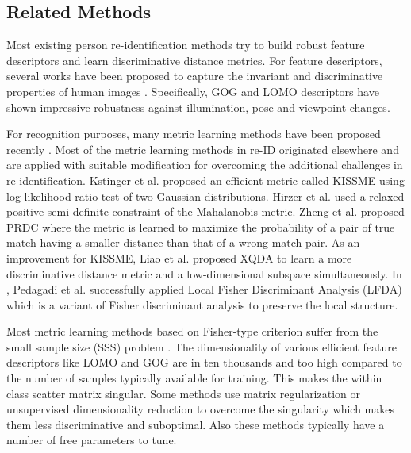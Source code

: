 \documentclass[runningheads]{llncs}
\begin{document}
\subsection{Related Methods}
Most existing person re-identification methods try to build robust feature descriptors and learn discriminative distance metrics. For feature descriptors, several works have been proposed to capture the invariant and discriminative properties of human images \cite{SDALF,LOMO,GOG,ELF,ColorInvariants,midlevel,colornames,LisantiPAMI14}. Specifically, GOG\cite{GOG} and LOMO\cite{LOMO} descriptors have shown impressive robustness against illumination, pose and viewpoint changes.


For recognition purposes, many metric learning methods have been proposed recently \cite{PRDC,RPLM,LFDA:CVPR,rPcca,KISSME,LOMO,ExPolyFeatMap,Zheng:nfst,SSSVM}. Most of the metric learning methods in re-ID originated elsewhere and are applied with suitable modification for overcoming the additional challenges in re-identification. Kstinger et al. proposed an efficient metric called KISSME \cite{KISSME} using log likelihood ratio test of two Gaussian distributions. Hirzer et al. \cite{RPLM} used a relaxed positive semi definite constraint of the Mahalanobis metric. Zheng et al. proposed PRDC\cite{PRDC} where the  metric is learned to maximize the probability of a pair of true match having a smaller distance than that of a wrong match pair.
As an improvement for KISSME\cite{KISSME}, Liao et al. proposed XQDA\cite{LOMO} to learn a more discriminative distance metric and a low-dimensional subspace simultaneously. In \cite{LFDA:CVPR}, Pedagadi et al. successfully applied  Local Fisher Discriminant Analysis (LFDA) \cite{LFDA:ICML} which is a variant of Fisher discriminant analysis to preserve the local structure.

Most metric learning methods based on Fisher-type criterion suffer from the small sample size (SSS) problem \cite{Zheng:nfst,guo:nfst}. The dimensionality of various efficient feature descriptors like LOMO\cite{LOMO} and GOG\cite{GOG} are in ten thousands and too high compared to the number of samples typically available for training. This makes the within class scatter matrix singular. Some methods use matrix regularization  \cite{LFDA:CVPR,rPcca,LOMO,LisantiDSC,GOG} or unsupervised dimensionality reduction \cite{KISSME,LFDA:CVPR} to overcome the singularity which makes them less discriminative and suboptimal. Also these methods typically  have a number of free parameters to tune.
\end{document}
